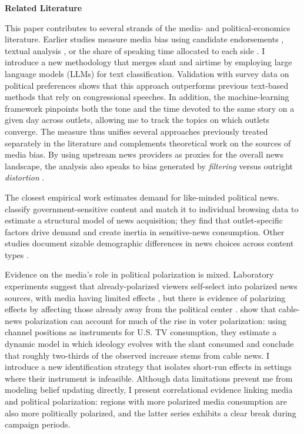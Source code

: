 \documentclass[12pt]{article}
\begin{document}
\textbf{Related Literature}


This paper contributes to several strands of the media- and political-economics literature. Earlier studies measure media bias using candidate endorsements \citep{ChiangKnight2011}, textual analysis \citep{gentzkow2010media,GentzkowShapiroTaddy2019}, or the share of speaking time allocated to each side \citep{durante2012partisan,CageHengelHerveUrvoy2022}. I introduce a new methodology that merges slant and airtime by employing large language models (LLMs) for text classification. Validation with survey data on political preferences shows that this approach outperforms previous text-based methods that rely on congressional speeches. In addition, the machine-learning framework pinpoints both the tone and the time devoted to the same story on a given day across outlets, allowing me to track the topics on which outlets converge. The measure thus unifies several approaches previously treated separately in the literature \citep{puglisi_review} and complements theoretical work on the sources of media bias. By using upstream news providers as proxies for the overall news landscape, the analysis also speaks to bias generated by \emph{filtering} versus outright \emph{distortion} \citep{gentzkow2014media}.

The closest empirical work estimates demand for like-minded political news. \citet{SimonovRao2022} classify government-sensitive content and match it to individual browsing data to estimate a structural model of news acquisition; they find that outlet-specific factors drive demand and create inertia in sensitive-news consumption. Other studies document sizable demographic differences in news choices across content types \citep{gambaro2021revealed,bang2023}.

Evidence on the media’s role in political polarization is mixed. Laboratory experiments suggest that already-polarized viewers self-select into polarized news sources, with media having limited effects \citep{arceneaux_johnson_2013}, but there is evidence of polarizing effects by affecting those already away from the political center \citep{levendusky}. \citet{martin2017} show that cable-news polarization can account for much of the rise in voter polarization: using channel positions as instruments for U.S. TV consumption, they estimate a dynamic model in which ideology evolves with the slant consumed and conclude that roughly two-thirds of the observed increase stems from cable news. I introduce a new identification strategy that isolates short-run effects in settings where their instrument is infeasible. Although data limitations prevent me from modeling belief updating directly, I present correlational evidence linking media and political polarization: regions with more polarized media consumption are also more politically polarized, and the latter series exhibits a clear break during campaign periods.
\end{document}
